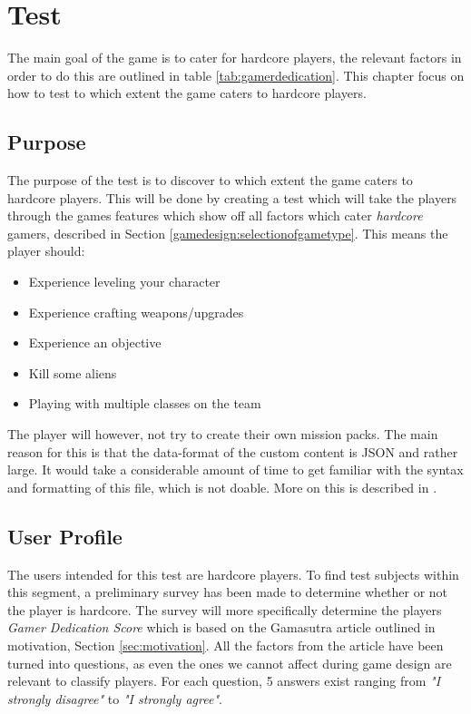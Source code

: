 \chapter{Test}
The main goal of the game is to cater for hardcore players, the relevant factors in order to do this are outlined in table \ref{tab:gamerdedication}.
This chapter focus on how to test to which extent the game caters to hardcore players.

\section{Purpose}
The purpose of the test is to discover to which extent the game caters to hardcore players.
This will be done by creating a test which will take the players through the games features which show off all factors which cater \emph{hardcore} gamers, described in Section \ref{gamedesign:selectionofgametype}.
This means the player should:
\begin{itemize}
	\item Experience leveling your character
	\item Experience crafting weapons/upgrades
	\item Experience an objective
	\item Kill some aliens
	\item Playing with multiple classes on the team
\end{itemize}

The player will however, not try to create their own mission packs. The main reason for this is that the data-format of the custom content is JSON and rather large. It would take a considerable amount of time to get familiar with the syntax and formatting of this file, which is not doable. More on this is described in .

\section{User Profile}
The users intended for this test are hardcore players.
To find test subjects within this segment, a preliminary survey has been made to determine whether or not the player is hardcore.
The survey will more specifically determine the players \textit{Gamer Dedication Score} which is based on the Gamasutra article\cite{casual_vs_hardcore} outlined in motivation, Section \ref{sec:motivation}.
All the factors from the article have been turned into questions, as even the ones we cannot affect during game design are relevant to classify players.
For each question, 5 answers exist ranging from \textit{"I strongly disagree"} to \textit{"I strongly agree"}.

